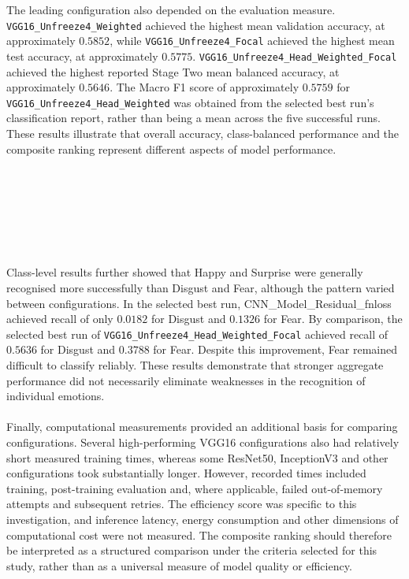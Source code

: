 \documentclass[12pt, a4paper]{report}
\begin{document}
			The leading configuration also depended on the evaluation measure.\\ \texttt{VGG16\_Unfreeze4\_Weighted} achieved the highest mean validation accuracy, at approximately $0.5852$, while \texttt{VGG16\_Unfreeze4\_Focal} achieved the highest mean test accuracy, at approximately $0.5775$. \texttt{VGG16\_Unfreeze4\_Head\_Weighted\_Focal} achieved the highest reported Stage Two mean balanced accuracy, at approximately $0.5646$. The Macro F1 score of approximately $0.5759$ for \\\texttt{VGG16\_Unfreeze4\_Head\_Weighted} was obtained from the selected best run's classification report, rather than being a mean across the five successful runs. These results illustrate that overall accuracy, class-balanced performance and the composite ranking represent different aspects of model performance.\\\\\\\\\\\\\\\\
			Class-level results further showed that Happy and Surprise were generally recognised more successfully than Disgust and Fear, although the pattern varied between configurations. In the selected best run, CNN\_Model\_Residual\_fnloss achieved recall of only $0.0182$ for Disgust and $0.1326$ for Fear. By comparison, the selected best run of \texttt{VGG16\_Unfreeze4\_Head\_Weighted\_Focal} achieved recall of $0.5636$ for Disgust and $0.3788$ for Fear. Despite this improvement, Fear remained difficult to classify reliably. These results demonstrate that stronger aggregate performance did not necessarily eliminate weaknesses in the recognition of individual emotions.\\\\
			Finally, computational measurements provided an additional basis for comparing configurations. Several high-performing VGG16 configurations also had relatively short measured training times, whereas some ResNet50, InceptionV3 and other configurations took substantially longer. However, recorded times included training, post-training evaluation and, where applicable, failed out-of-memory attempts and subsequent retries. The efficiency score was specific to this investigation, and inference latency, energy consumption and other dimensions of computational cost were not measured. The composite ranking should therefore be interpreted as a structured comparison under the criteria selected for this study, rather than as a universal measure of model quality or efficiency.
\end{document}
